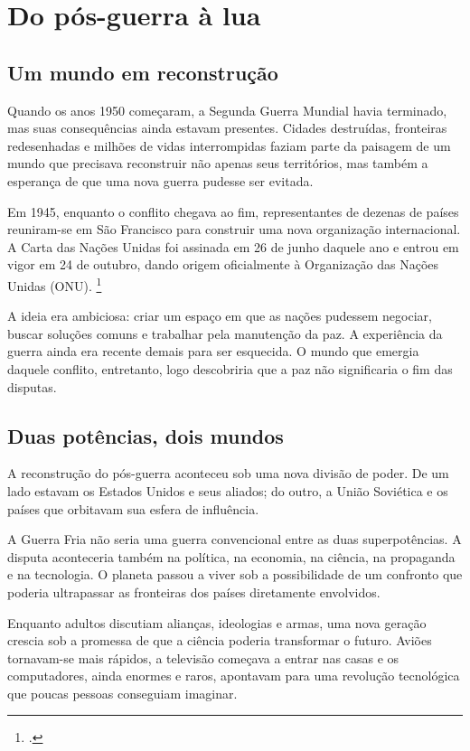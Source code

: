 \temaMundo
\chapter*{Do pós-guerra à lua}

\section*{Um mundo em reconstrução}

Quando os anos 1950 começaram, a Segunda Guerra Mundial havia terminado,
mas suas consequências ainda estavam presentes. Cidades destruídas,
fronteiras redesenhadas e milhões de vidas interrompidas faziam parte
da paisagem de um mundo que precisava reconstruir não apenas seus
territórios, mas também a esperança de que uma nova guerra pudesse ser
evitada.

Em 1945, enquanto o conflito chegava ao fim, representantes de dezenas
de países reuniram-se em São Francisco para construir uma nova
organização internacional. A Carta das Nações Unidas foi assinada em
26 de junho daquele ano e entrou em vigor em 24 de outubro, dando
origem oficialmente à Organização das Nações Unidas (ONU).%
\footcite{onu1945}

A ideia era ambiciosa: criar um espaço em que as nações pudessem
negociar, buscar soluções comuns e trabalhar pela manutenção da paz.
A experiência da guerra ainda era recente demais para ser esquecida.
O mundo que emergia daquele conflito, entretanto, logo descobriria
que a paz não significaria o fim das disputas.

\section*{Duas potências, dois mundos}

A reconstrução do pós-guerra aconteceu sob uma nova divisão de poder.
De um lado estavam os Estados Unidos e seus aliados; do outro, a
União Soviética e os países que orbitavam sua esfera de influência.

A Guerra Fria não seria uma guerra convencional entre as duas
superpotências. A disputa aconteceria também na política, na economia,
na ciência, na propaganda e na tecnologia. O planeta passou a viver
sob a possibilidade de um confronto que poderia ultrapassar as
fronteiras dos países diretamente envolvidos.

Enquanto adultos discutiam alianças, ideologias e armas, uma nova
geração crescia sob a promessa de que a ciência poderia transformar
o futuro. Aviões tornavam-se mais rápidos, a televisão começava a
entrar nas casas e os computadores, ainda enormes e raros, apontavam
para uma revolução tecnológica que poucas pessoas conseguiam imaginar.

